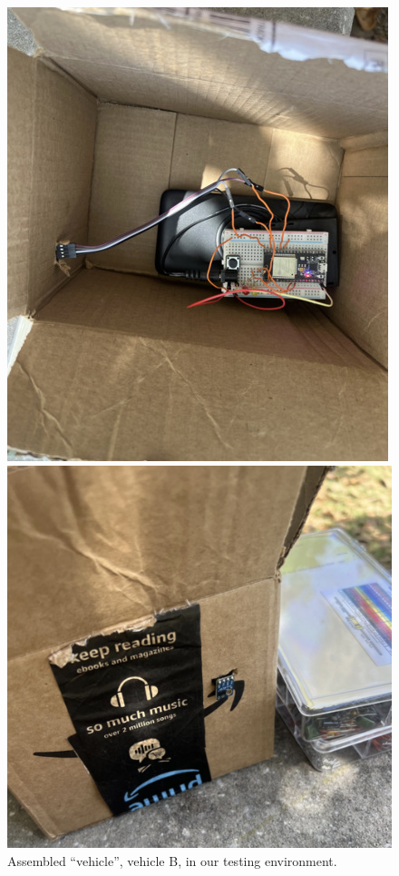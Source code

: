 \documentclass[conference]{IEEEtran}
\begin{document}
\begin{figure}[htbp]
\centerline{\includegraphics[width=\linewidth]{pics/bp_vehicle.jpg}}
\centerline{\includegraphics[width=\linewidth]{pics/bp_vehicle_outside.jpg}}
\caption{Assembled ``vehicle'', vehicle B, in our testing environment.}
\label{bp_outside}
\end{figure}
\end{document}
